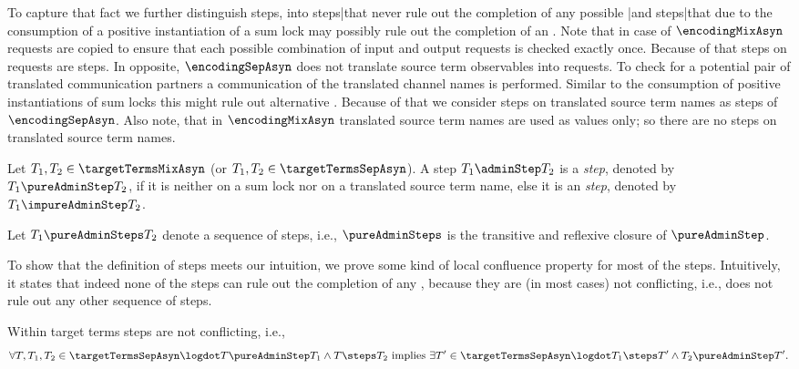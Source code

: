 \documentclass[]{llncs}
\begin{document}
To capture that fact we further distinguish \admin steps, into \pure \admin steps|that never rule out the completion of any possible \simulation\!\!|and \impure \admin steps|that due to the consumption of a positive instantiation of a sum lock may possibly rule out the completion of an \simulation. Note that in case of $ \encodingMixAsyn $ requests are copied to ensure that each possible combination of input and output requests is checked exactly once. Because of that steps on requests are \pure \admin steps. In opposite, $ \encodingSepAsyn $ does not translate source term observables into requests. To check for a potential pair of translated communication partners a communication of the translated channel names is performed. Similar to the consumption of positive instantiations of sum locks this might rule out alternative \simulations. Because of that we consider steps on translated source term names as \impure \admin steps of $ \encodingSepAsyn $. Also note, that in $ \encodingMixAsyn $ translated source term names are used as values only; so there are no steps on translated source term names.

\begin{definition} \label{def:pureImpureAdminStep}
	Let $ T_1, T_2 \in \targetTermsMixAsyn $ (or $ T_1, T_2 \in \targetTermsSepAsyn $). A step $ T_1 \adminStep T_2 $ is a \emph{\pure \admin step}, denoted by $ T_1 \pureAdminStep T_2 $, if it is neither on a sum lock nor on a translated source term name, else it is an \emph{\impure \admin step}, denoted by $ T_1 \impureAdminStep T_2 $.
	
	Let $ T_1 \pureAdminSteps T_2 $ denote a sequence of \pure \admin steps, i.e., $ \pureAdminSteps $ is the transitive and reflexive closure of $ \pureAdminStep $.
\end{definition}

To show that the definition of \pure \admin steps meets our intuition, we prove some kind of local confluence property for most of the \pure \admin steps. Intuitively, it states that indeed none of the \pure \admin steps can rule out the completion of any \simulation, because they are (in most cases) not conflicting, i.e., does not rule out any other sequence of steps.

\begin{lemma} \label{lem:nonConflictingStepsSepAsyn}
	Within target terms \pure \admin steps are not conflicting, i.e.,
	\begin{align*}
		\forall T, T_1, T_2 \in \targetTermsSepAsyn \logdot T \pureAdminStep T_1 \wedge T \steps T_2 \text{ implies } \exists T' \in \targetTermsSepAsyn \logdot T_1 \steps T' \wedge T_2 \pureAdminStep T'.
	\end{align*}
\end{lemma}
\end{document}
